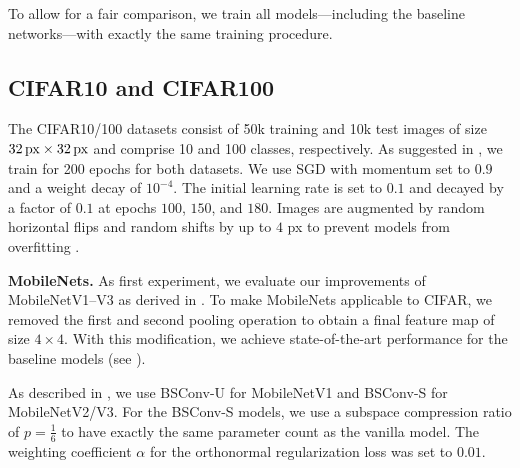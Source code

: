 \documentclass[10pt,twocolumn,letterpaper]{article}
\newcommand{\DCCK}{BSConv\xspace}
\newcommand{\DCCKU}{\DCCK-U\xspace}
\newcommand{\DCCKS}{\DCCK-S\xspace}
\begin{document}
To allow for a fair comparison, we train all models---including the baseline networks---with exactly the same training procedure.

\subsection{CIFAR10 and CIFAR100}
The CIFAR10/100 datasets \cite{krizhevsky2009learning} consist of 50k training and 10k test images of size $32\text{\,px} \times 32\text{\,px}$ and comprise 10 and 100 classes, respectively.
As suggested in \cite{he2016deep,zagoruyko2016wide}, we train for 200 epochs for both datasets.
We use SGD with momentum set to $0.9$ and a weight decay of $10^{-4}$.
The initial learning rate is set to $0.1$ and decayed by a factor of $0.1$ at epochs $100$, $150$, and $180$.
Images are augmented by random horizontal flips and random shifts by up to $4$ px to prevent models from overfitting \cite{he2016deep, zagoruyko2016wide}.

\textbf{MobileNets.}
As first experiment, we evaluate our improvements of MobileNetV1--V3 \cite{howard2017mobilenets,sandler2018mobilenetv2,howard2019searching} as derived in .
To make MobileNets applicable to CIFAR, we removed the first and second pooling operation to obtain a final feature map of size $4 \times 4$.
With this modification, we achieve state-of-the-art performance for the baseline models (see ).

As described in , we use \DCCKU for \mbox{MobileNetV1} and \DCCKS for MobileNetV2/V3.
For the \DCCKS models, we use a subspace compression ratio of $p = \frac{1}{6}$ to have exactly the same parameter count as the vanilla model.
The weighting coefficient $\alpha$ for the orthonormal regularization loss was set to $0.01$.
\end{document}
